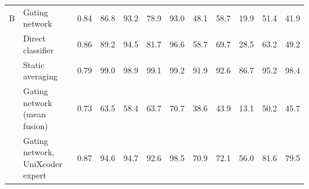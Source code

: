 \begin{table}[t]
\begin{tabular}{ll|c|cccc|cccc|c}
\midrule
B & Gating network & 0.84 & 86.8 & 93.2 & 78.9 & 93.0 & 48.1 & 58.7 & 19.9 & 51.4 & 41.9 \\
 & Direct classifier & 0.86 & 89.2 & 94.5 & 81.7 & 96.6 & 58.7 & 69.7 & 28.5 & 63.2 & 49.2 \\
 & Static averaging & 0.79 & 99.0 & 98.9 & 99.1 & 99.2 & 91.9 & 92.6 & 86.7 & 95.2 & 98.4 \\
 & Gating network (mean fusion) & 0.73 & 63.5 & 58.4 & 63.7 & 70.7 & 38.6 & 43.9 & 13.1 & 50.2 & 45.7 \\
 & Gating network, UniXcoder expert & 0.87 & 94.6 & 94.7 & 92.6 & 98.5 & 70.9 & 72.1 & 56.0 & 81.6 & 79.5 \\
\bottomrule
\end{tabular}
\end{table}